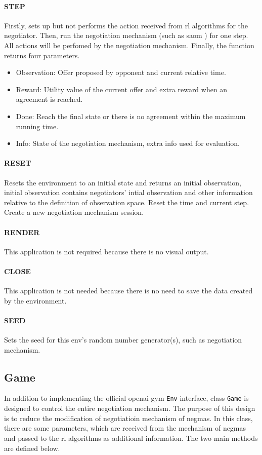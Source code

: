 \paragraph{STEP} Firstly, sets up but not performs the action received from \gls{rl} algorithms for the negotiator. Then, run the negotiation mechanism (such as \gls{saom} ) for one step. All actions will be perfomed by the negotiation mechanism. Finally, the function returns four parameters.

\begin{itemize}
	\item Observation: Offer proposed by opponent and current relative time.
	\item Reward: Utility value of the current offer and extra reward when an agreement is reached.
	\item Done: Reach the final state or there is no agreement within the maximum running time.
	\item Info: State of the negotiation mechanism, extra info used for evaluation.
\end{itemize}

\paragraph{RESET} Resets the environment to an initial state and returns an initial observation, initial observation contains negotiators' intial observation and other information relative to the definition of observation space. Reset the time and current step. Create a new negotiation mechanism session.
\paragraph{RENDER} This application is not required because there is no visual output.
\paragraph{CLOSE}  This application is not needed because there is no need to save the data created by the environment.
\paragraph{SEED} Sets the seed for this env's random number generator(s), such as negotiation mechanism.

\subsection{Game} \label{game}
In addition to implementing the official \gls{openai gym} \texttt{Env} interface, class \texttt{Game} is designed to control the entire negotiation mechanism. The purpose of this design is to reduce the modification of negotiatioin mechanism of \gls{negmas}. In this class, there are some parameters, which are received from the mechanism of \gls{negmas} and passed to the \gls{rl} algorithms as additional information. The two main methods are defined below.
 

